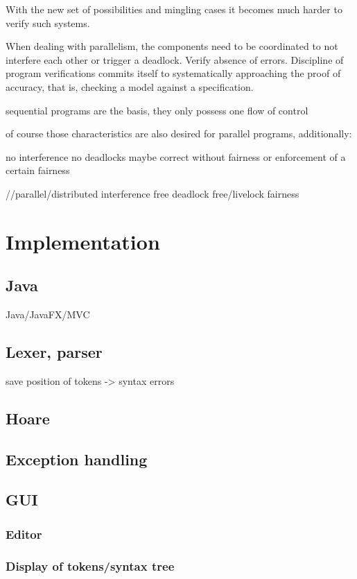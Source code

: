 With the new set of possibilities and mingling cases it becomes much harder to verify such systems.

When dealing with parallelism, the components need to be coordinated
to not interfere each other or trigger a deadlock. Verify absence
of errors. Discipline of program verifications commits itself to systematically
approaching the proof of accuracy, that is, checking a model against
a specification.

sequential programs are the basis, they only possess one flow of control

of course those characteristics are also desired for parallel programs,
additionally:

no interference
no deadlocks
maybe correct without fairness or enforcement of a certain fairness

//parallel/distributed
interference free
deadlock free/livelock
fairness

\chapter{Implementation}

\section{Java}
Java/JavaFX/MVC

\section{Lexer, parser}

save position of tokens -> syntax errors

\section{Hoare}

\section{Exception handling}

\section{GUI}

\subsection{Editor}
\subsection{Display of tokens/syntax tree}
